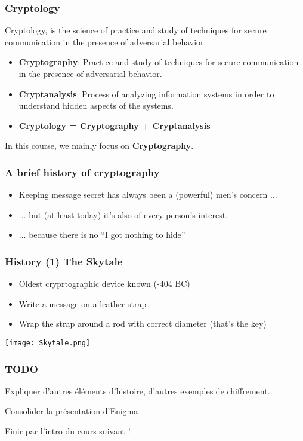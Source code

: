 \documentclass[
hyperref={pdfpagelabels=false}
,xcolor=table
]
{beamer}
\begin{document}
\begin{frame}
  \frametitle{Cryptology}

  Cryptology, is the science of practice and study of techniques for secure communication in the presence of adversarial behavior.

  \begin{itemize}
  \item \textbf{Cryptography}: Practice and study of techniques for secure communication in the presence of adversarial behavior.
  \item \textbf{Cryptanalysis}: Process of analyzing information systems in order to understand hidden aspects of the systems. 
  \item \textbf{Cryptology = Cryptography + Cryptanalysis}
  \end{itemize}

  In this course, we mainly focus on \textbf{Cryptography}. 
\end{frame}


\begin{frame}
  \frametitle{A brief history of cryptography}

  \begin{itemize}
  \item Keeping message secret has always been a (powerful) men's
    concern ...
  \item  ... but (at least today) it's also of every person's interest. 
  \item ... because there is no ``I got nothing to hide'' 
  \end{itemize}
\end{frame}



\begin{frame}
  \frametitle{History (1) The Skytale}
  \begin{itemize}
  \item Oldest cryprtographic device known (-404 BC)
  \item Write a message on a leather strap
  \item Wrap the strap around a rod with correct diameter (that's the key)
  \end{itemize}

  \begin{center}
    \texttt{[image: Skytale.png]}
  \end{center}
  
\end{frame}


\begin{frame}
  \frametitle{TODO}

  Expliquer d'autres éléments d'histoire, d'autres exemples de chiffrement.

  Consolider la présentation d'Enigma

  Finir par l'intro du cours suivant ! 
  
  
\end{frame}
\end{document}

